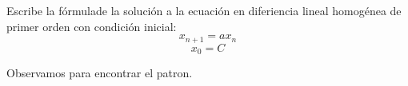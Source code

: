 \documentclass{article}
\begin{document}
Escribe la fórmulade la solución a la ecuación en diferiencia lineal homogénea de primer orden con condición inicial:$$x_{n+1}=ax_{n} $$ $$x_{0}=C$$

Observamos para encontrar el patron. 
\end{document}
